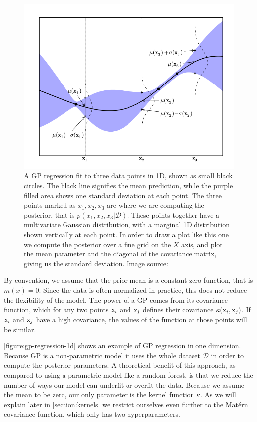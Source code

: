 \begin{figure}
	\begin{center}
		\includegraphics[width=1.0\textwidth]{images/gp-1d.png}
		\caption{A GP regression fit to three data points in 1D, shown as small black circles. The black line signifies the mean prediction, while the purple filled area shows one standard deviation at each point. The three points marked as $x_1, x_2, x_3$ are where we are computing the posterior, that is $p(x_1, x_2, x_3 | \mathcal{D})$. These points together have a multivariate Gaussian distribution, with a marginal 1D distribution shown vertically at each point. In order to draw a plot like this one we compute the posterior over a fine grid on the $X$ axis, and plot the mean parameter and the diagonal of the covariance matrix, giving us the standard deviation. Image source: \cite{nando-bopt-tutorial}}
		\label{figure:gp-regression-1d}
	\end{center}
\end{figure}

By convention, we assume that the prior mean is a constant zero function, that
is $m(x) = 0$. Since the data is often normalized in practice, this does not
reduce the flexibility of the model. The power of a GP comes from its
covariance function, which for any two points ${\textnormal{x}}_i$ and ${\textnormal{x}}_j$ defines their
covariance $\kappa({\textnormal{x}}_i, {\textnormal{x}}_j)$. If ${\textnormal{x}}_i$ and ${\textnormal{x}}_j$ have a high covariance,
the values of the function at those points will be similar.

\autoref{figure:gp-regression-1d} shows an example of GP regression in one dimension. Because GP is a non-parametric model it uses the whole dataset $\mathcal{D}$ in order to compute the posterior parameters. A theoretical benefit of this approach, as compared to using a parametric model like a random forest, is that we reduce the number of ways our model can underfit or overfit the data. Because we assume the mean to be zero, our only parameter is the kernel function $\kappa$. As we will explain later in \autoref{section:kernels} we restrict ourselves even further to the Mat\'ern covariance function, which only has two hyperparameters.

